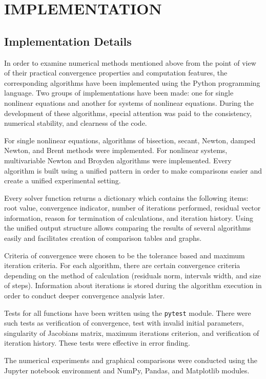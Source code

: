 \chapter{\MakeUppercase{Implementation}}

\section{Implementation Details}

In order to examine numerical methods mentioned above from the point of view of their practical convergence properties and computation features, the corresponding algorithms have been implemented using the Python programming language. Two groups of implementations have been made: one for single nonlinear equations and another for systems of nonlinear equations. During the development of these algorithms, special attention was paid to the consistency, numerical stability, and clearness of the code.

For single nonlinear equations, algorithms of bisection, secant, Newton, damped Newton, and Brent methods were implemented. For nonlinear systems, multivariable Newton and Broyden algorithms were implemented. Every algorithm is built using a unified pattern in order to make comparisons easier and create a unified experimental setting.

Every solver function returns a dictionary which contains the following items: root value, convergence indicator, number of iterations performed, residual vector information, reason for termination of calculations, and iteration history. Using the unified output structure allows comparing the results of several algorithms easily and facilitates creation of comparison tables and graphs.

Criteria of convergence were chosen to be the tolerance based and maximum iteration criteria. For each algorithm, there are certain convergence criteria depending on the method of calculation (residuals norm, intervals width, and size of steps). Information about iterations is stored during the algorithm execution in order to conduct deeper convergence analysis later.

Tests for all functions have been written using the \texttt{pytest} module. There were such tests as verification of convergence, test with invalid initial parameters, singularity of Jacobians matrix, maximum iterations criterion, and verification of iteration history. These tests were effective in error finding.

The numerical experiments and graphical comparisons were conducted using the Jupyter notebook environment and NumPy, Pandas, and Matplotlib modules.


